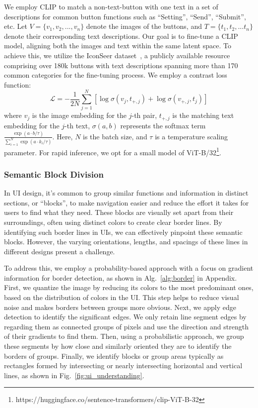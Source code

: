 We employ CLIP to match a non-text-button with one text in a set of descriptions for common button functions such as ``Setting'', ``Send'', ``Submit'', etc. Let \(V=\{v_1,v_2,...,v_n\}\) denote the images of the buttons, and \(T=\{t_1,t_2,...t_n\}\) denote their corresponding text descriptions. Our goal is to fine-tune a CLIP model, aligning both the images and text within the same latent space. To achieve this, we utilize the IconSeer dataset~\cite{li2023you}, a publicly available resource comprising over 180k buttons with text descriptions spanning more than 170 common categories for the fine-tuning process. We employ a contrast loss function:
\[
\mathcal{L} = -\frac{1}{2N} \sum_{j=1}^{N} \left[ \log \sigma(v_j, t_{+,j}) + \log \sigma(v_{+,j}, t_j) \right]
\]
where \( v_j \) is the image embedding for the \( j \)-th pair, \( t_{+,j} \) is the matching text embedding for the \( j \)-th text, \( \sigma(a, b) \) represents the softmax term \(\frac{\exp(a \cdot b / \tau)}{\sum_{i=1}^{N} \exp(a \cdot k_i / \tau)}\). Here, \( N \) is the batch size, and \( \tau \) is a temperature scaling parameter. For rapid inference, we opt for a small model of ViT-B/32\footnote{https://huggingface.co/sentence-transformers/clip-ViT-B-32}. 

\subsubsection{Semantic Block Division}
In UI design, it's common to group similar functions and information in distinct sections, or ``blocks'', to make navigation easier and reduce the effort it takes for users to find what they need. These blocks are visually set apart from their surroundings, often using distinct colors to create clear border lines. By identifying such border lines in UIs, we can effectively pinpoint these semantic blocks. However, the varying orientations, lengths, and spacings of these lines in different designs present a challenge.

To address this, we employ a probability-based approach with a focus on gradient information for border detection, as shown in Alg.~\ref{alg:border} in Appendix. First, we quantize the image by reducing its colors to the most predominant ones, based on the distribution of colors in the UI. This step helps to reduce visual noise and makes borders between groups more obvious. Next, we apply edge detection to identify the significant edges. We only retain line segment edges by regarding them as connected groups of pixels and use the direction and strength of their gradients to find them. Then, using a probabilistic approach, we group these segments by how close and similarly oriented they are to identify the borders of groups. Finally, we identify blocks or group areas typically as rectangles formed by intersecting or nearly intersecting horizontal and vertical lines, as shown in Fig.~\ref{fig:ui_understanding}.

